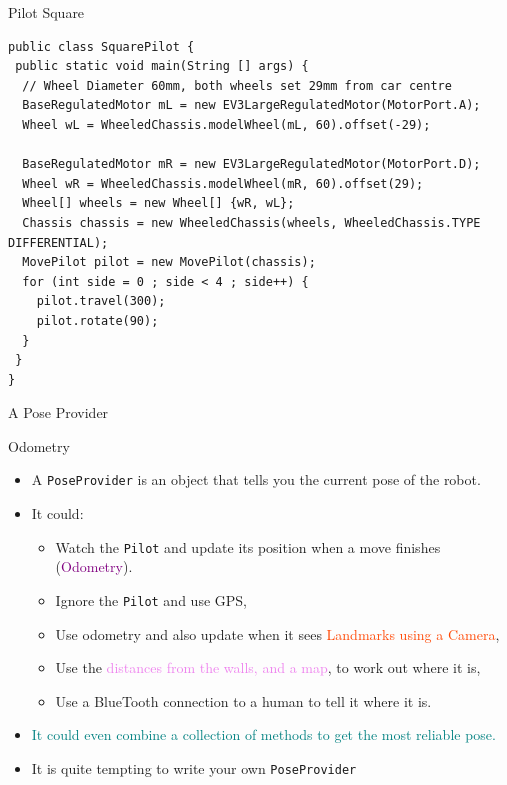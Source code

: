 \documentclass[color=pdftex,usenames,dvipsnames, aspectratio=169]{beamer}
\begin{document}
\begin{frame}[fragile]{Pilot Square}
\begin{lstlisting}[basicstyle=\ttfamily\scriptsize\color{blue},emph={MovePilot, pilot, ws,WheeledChassis,Wheel,ModelWheel, offset}]
public class SquarePilot {
 public static void main(String [] args) {
  // Wheel Diameter 60mm, both wheels set 29mm from car centre
  BaseRegulatedMotor mL = new EV3LargeRegulatedMotor(MotorPort.A);
  Wheel wL = WheeledChassis.modelWheel(mL, 60).offset(-29); 

  BaseRegulatedMotor mR = new EV3LargeRegulatedMotor(MotorPort.D);
  Wheel wR = WheeledChassis.modelWheel(mR, 60).offset(29);
  Wheel[] wheels = new Wheel[] {wR, wL};
  Chassis chassis = new WheeledChassis(wheels, WheeledChassis.TYPE DIFFERENTIAL);
  MovePilot pilot = new MovePilot(chassis);
  for (int side = 0 ; side < 4 ; side++) {
    pilot.travel(300);
    pilot.rotate(90);
  }
 }
}

\end{lstlisting}
\end{frame}

\begin{frame}{A Pose Provider}
\begin{block}{Odometry}
\begin{itemize}
\item A \lstinline!PoseProvider! is an object that tells you the current pose of the robot.
\item It could:
\begin{itemize}
  \item Watch the \lstinline!Pilot! and update its position when a move finishes (\textcolor{purple}{Odometry}).
  \item Ignore the \lstinline!Pilot! and use \textcolor{OliveGreen}{GPS},
  \item Use odometry and also update when it sees \textcolor{OrangeRed}{Landmarks using a Camera},
  \item Use the \textcolor{violet}{distances from the walls, and a map}, to work out where it is,
  \item Use \textcolor{BrickRed}{a BlueTooth connection to a human} to tell it where it is.
\end{itemize}
\item \textcolor{teal}{It could even combine a collection of methods to get the most reliable pose.}
\item \textcolor{RedOrange}{It is quite tempting to write your own \lstinline!PoseProvider!}
\end{itemize}
\end{block}
\end{frame}
\end{document}
